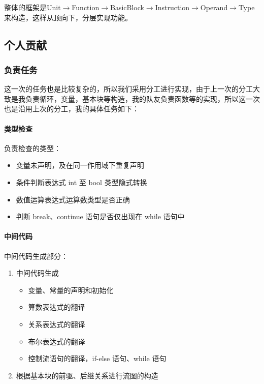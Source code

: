 \documentclass[UTF8,a4paper,10pt]{ctexart}
\begin{document}
整体的框架是Unit$\rightarrow$Function$\rightarrow$BasicBlock$\rightarrow$Instruction$\rightarrow$Operand$\rightarrow$Type来构造，这样从顶向下，分层实现功能。


\subsection{个人贡献}
\subsubsection{负责任务}
这一次的任务也是比较复杂的，所以我们采用分工进行实现，由于上一次的分工大致是我负责循环，变量，基本块等构造，我的队友负责函数等的实现，所以这一次也是沿用上次的分工，我的具体任务如下：

\paragraph{类型检查}

负责检查的类型：


\begin{itemize}
  \item 变量未声明，及在同一作用域下重复声明
  \item 条件判断表达式 int 至 bool 类型隐式转换
  \item 数值运算表达式运算数类型是否正确
  \item 判断 break、continue 语句是否仅出现在 while 语句中
\end{itemize}

\paragraph{中间代码}

中间代码生成部分：

\begin{enumerate}
  \item 中间代码生成
  \begin{itemize}
    \item 变量、常量的声明和初始化
    \item 算数表达式的翻译
    \item 关系表达式的翻译
    \item 布尔表达式的翻译
    \item 控制流语句的翻译，if-else 语句、while 语句
  \end{itemize}
  \item 根据基本块的前驱、后继关系进行流图的构造
\end{enumerate}
\end{document}
